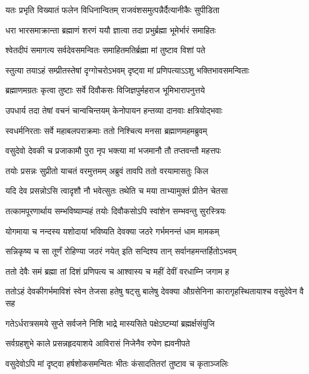 \twolineshloka
{यतः प्रभृति विख्यातं फलेन विधिनान्वितम्}
{राजवंशसमुत्पन्नैर्दैत्यानीकैः सुपीडिता}%

\twolineshloka
{धरा भारसमाक्रान्ता ब्रह्माणं शरणं ययौ}
{ज्ञात्वा तदा प्रभुर्ब्रह्मा भूमेर्भारं समाहितः}%

\twolineshloka
{श्वेतदीपं समागत्य सर्वदेवसमन्वितः}
{समाहितमतिर्ब्रह्मा मां तुष्टाव विशां पते}%

\twolineshloka
{स्तुत्या तयाऽहं सम्प्रीतस्तेषां दृग्गोचरोऽभवम्}
{दृष्ट्वा मां प्रणिपत्याऽऽशु भक्तिभावसमन्विताः}%

\twolineshloka
{ब्रह्माणमग्रतः कृत्वा तुष्टाः सर्वे दिवौकसः}
{विजिज्ञपुर्महराज भूमिभारापनुत्तये}%

\twolineshloka
{उपधार्य तदा तेषां वचनं चान्वचिन्तयम्}
{केनोपायन हन्तव्या दानवाः क्षत्रियोद्भवाः}%

\twolineshloka
{स्वधर्मनिरताः सर्वे महाबलपराक्रमाः}
{ततो निश्चित्य मनसा ब्रह्माणमहमब्रुवम्}%

\twolineshloka
{वसुदेवो देवकी च प्रजाकामौ पुरा नृप}
{भक्त्या मां भजमानौ तौ तप्तवन्तौ महत्तपः}%

\twolineshloka
{तयोः प्रसन्नः सुप्रीतो याचतं वरमुत्तमम्}
{अब्रुवं तावपि ततो वरयामासतुः किल}%

\twolineshloka
{यदि देव प्रसन्नोऽसि त्वादृशौ नौ भवेत्सुतः}
{तथेति च मया ताभ्यामुक्तं प्रीतेन चेतसा}%

\twolineshloka
{तत्कामपूरणार्थाय सम्भविष्याम्यहं तयोः}
{दिवौकसोऽपि स्वांशेन सम्भवन्तु सुरस्त्रियः}%

\twolineshloka
{योगमाया च नन्दस्य यशोदायां भविष्यति}
{देवक्या जठरे गर्भमनन्तं धाम मामकम्}%

\twolineshloka
{सन्निकृष्य च सा तूर्णं रोहिण्या जठरं नयेत्}
{इति सन्दिश्य तान् सर्वानहमन्तर्हितोऽभवम्}%

\twolineshloka
{ततो देवैः समं ब्रह्मा तां दिशं प्रणिपत्य च}
{आश्वास्य च महीं देवीं वरधाम्नि जगाम ह}%

\threelineshloka
{ततोऽहं देवकीगर्भमाविशं स्वेन तेजसा}
{हतेषु षट्सु बालेषु देवक्या औग्रसेनिना}
{कारागृहस्थितायाश्च वसुदेवेन वै सह}%

\twolineshloka
{गतेऽर्धरात्रसमये सुप्ते सर्वजने निशि}
{भाद्रे मास्यसिते पक्षेऽष्टम्यां ब्रह्मर्क्षसंयुजि}%

\twolineshloka
{सर्वग्रहशुभे काले प्रसन्नहृदयाशये}
{आविरासं निजेनैव रुपेण ह्यवनीपते}%

\twolineshloka
{वसुदेवोऽपि मां दृष्ट्वा हर्षशोकसमन्वितः}
{भीतः कंसादतितरां तुष्टाव च कृताञ्जलिः}%

